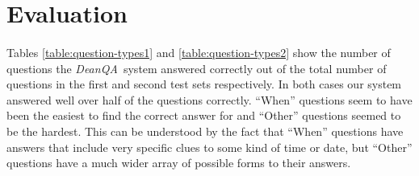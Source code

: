 \documentclass[11pt,letterpaper]{article}
\newcommand{\name}{\emph{DeanQA~}}
\begin{document}

\section{Evaluation}
\label{sec:evaluation}
\paragraph{}
Tables \ref{table:question-types1} and \ref{table:question-types2} show the 
number of questions the \name system answered correctly out of the total
 number of questions in the first and second test sets respectively.
 In both cases our system answered well over half of the questions 
 correctly.  ``When'' questions seem to have been the easiest to find
 the correct answer for and ``Other'' questions seemed to be the hardest.
 This can be understood by the fact that ``When'' questions have answers 
 that include very specific clues to some kind of time or date, but 
 ``Other'' questions have a much wider array of possible forms to their answers.
\end{document}
